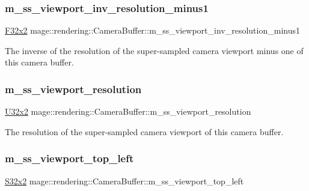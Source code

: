 \subsubsection{\texorpdfstring{m\+\_\+ss\+\_\+viewport\+\_\+inv\+\_\+resolution\+\_\+minus1}{m\_ss\_viewport\_inv\_resolution\_minus1}}
{\footnotesize\ttfamily \hyperlink{namespacemage_aa87237ad091f5cd7da612b8523fc108f}{F32x2} mage\+::rendering\+::\+Camera\+Buffer\+::m\+\_\+ss\+\_\+viewport\+\_\+inv\+\_\+resolution\+\_\+minus1}

The inverse of the resolution of the super-\/sampled camera viewport minus one of this camera buffer. \hypertarget{structmage_1_1rendering_1_1_camera_buffer_a96b17352187228ee2265be33d3f2d159}{}\label{structmage_1_1rendering_1_1_camera_buffer_a96b17352187228ee2265be33d3f2d159} 
\subsubsection{\texorpdfstring{m\+\_\+ss\+\_\+viewport\+\_\+resolution}{m\_ss\_viewport\_resolution}}
{\footnotesize\ttfamily \hyperlink{namespacemage_a88e05bff0300120c013285d3dcad95c5}{U32x2} mage\+::rendering\+::\+Camera\+Buffer\+::m\+\_\+ss\+\_\+viewport\+\_\+resolution}

The resolution of the super-\/sampled camera viewport of this camera buffer. \hypertarget{structmage_1_1rendering_1_1_camera_buffer_a3373440adfd588f0b3aa675210a9b501}{}\label{structmage_1_1rendering_1_1_camera_buffer_a3373440adfd588f0b3aa675210a9b501} 
\subsubsection{\texorpdfstring{m\+\_\+ss\+\_\+viewport\+\_\+top\+\_\+left}{m\_ss\_viewport\_top\_left}}
{\footnotesize\ttfamily \hyperlink{namespacemage_a02de5a44f35ee9917e5788d63795fece}{S32x2} mage\+::rendering\+::\+Camera\+Buffer\+::m\+\_\+ss\+\_\+viewport\+\_\+top\+\_\+left}

